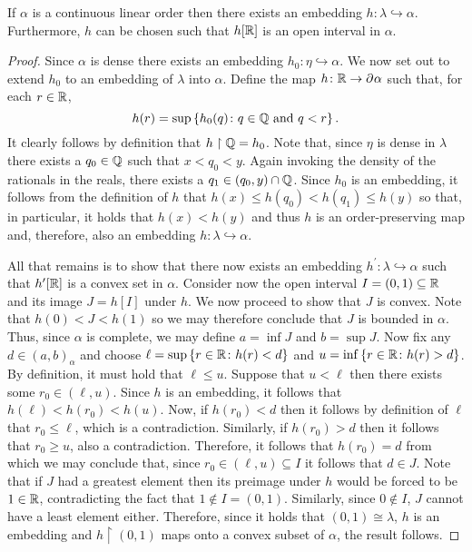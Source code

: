 \begin{prp}\label{prp:cont}
	If $\alpha$ is a continuous linear order then there exists an embedding $h\colon\lambda\hookrightarrow\alpha$.  Furthermore, $h$ can be chosen such that $h[\mathbb{R}]$ is an open interval in $\alpha$.
\end{prp}
\begin{proof}
	Since $\alpha$ is dense there exists an embedding $h_0\colon\eta\hookrightarrow\alpha$.  We now set out to extend $h_0$ to an embedding of $\lambda$ into $\alpha$.  Define the map $h\colon\mathbb{R}\to\partial^{}\alpha$ such that, for each $r\in\mathbb{R}$,
	\begin{equation}
		h(r)=\sup\left\lbrace h_0(q)\colon q\in\mathbb{Q}\text{ and }q<r \right\rbrace.
	\end{equation}
	It clearly follows by definition that $h\restriction\mathbb{Q}=h_0$.  Note that, since $\eta$ is dense in $\lambda$ there exists a $q_0\in\mathbb{Q}$ such that $x<q_0<y$.  Again invoking the density of the rationals in the reals, there exists a $q_1\in(q_0,y)\cap\mathbb{Q}$.  Since $h_0$ is an embedding, it follows from the definition of $h$ that $h(x)\leq h(q_0)<h(q_1)\leq h(y)$ so that, in particular, it holds that $h(x)<h(y)$ and thus $h$ is an order-preserving map and, therefore, also an embedding $h\colon\lambda\hookrightarrow\alpha$.

	All that remains is to show that there now exists an embedding $h^\prime\colon\lambda\hookrightarrow\alpha$ such that $h^\prime[\mathbb{R}]$ is a convex set in $\alpha$.  Consider now the open interval $I=(0,1)\subseteq\mathbb{R}$ and its image $J=h[I]$ under $h$.  We now proceed to show that $J$ is convex.  Note that $h(0)<J<h(1)$ so we may therefore conclude that $J$ is bounded in $\alpha$.  Thus, since $\alpha$ is complete, we may define $a=\inf J$ and $b=\sup J$.  Now fix any $d\in(a,b)_\alpha$ and choose $\ell=\sup\left\lbrace r\in\mathbb{R}\colon h(r)<d \right\rbrace$ and $u=\inf\left\lbrace r\in\mathbb{R}\colon h(r)>d \right\rbrace$.  By definition, it must hold that $\ell\leq u$.  Suppose that $u<\ell$ then there exists some $r_0\in(\ell,u)$.  Since $h$ is an embedding, it follows that $h(\ell)<h(r_0)<h(u)$.  Now, if $h(r_0)<d$ then it follows by definition of $\ell$ that $r_0\leq\ell$, which is a contradiction.  Similarly, if $h(r_0)>d$ then it follows that $r_0\geq u$, also a contradiction.  Therefore, it follows that $h(r_0)=d$ from which we may conclude that, since $r_0\in(\ell,u)\subseteq I$ it follows that $d\in J$.  Note that if $J$ had a greatest element then its preimage under $h$ would be forced to be $1\in\mathbb{R}$, contradicting the fact that $1\notin I=(0,1)$.  Similarly, since $0\notin I$, $J$ cannot have a least element either.  Therefore, since it holds that $(0,1)\cong\lambda$, $h$ is an embedding and $h\restriction(0,1)$ maps onto a convex subset of $\alpha$, the result follows.
\end{proof}

